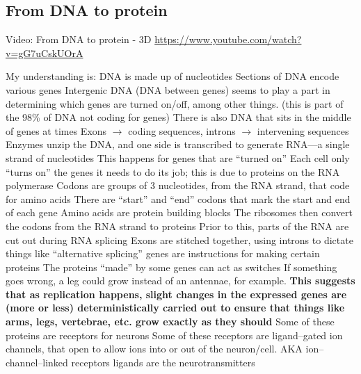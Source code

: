 \documentclass[11pt, a4paper, oneside]{article}   	%
\begin{document}
\subsection{From DNA to protein}

Video: From DNA to protein - 3D
\url{https://www.youtube.com/watch?v=gG7uCskUOrA}

\begin{outline}
  \nopoint My understanding is:
  \point DNA is made up of nucleotides
  \point Sections of DNA encode various genes
    \subpoint Intergenic DNA (DNA between genes) seems to play a part in determining which genes are turned on/off, among other things. (this is part of the 98\% of DNA not coding for genes)
        \subsubpoint There is also DNA that sits in the middle of genes at times
            \supersubpoint Exons $\rightarrow$ coding sequences, introns $\rightarrow$ intervening sequences
  \point Enzymes unzip the DNA, and one side is transcribed to generate RNA---a single strand of nucleotides
    \subpoint This happens for genes that are ``turned on'' 
    \subpoint Each cell only ``turns on'' the genes it needs to do its job; this is due to proteins on the RNA polymerase
  \point Codons are groups of 3 nucleotides, from the RNA strand, that code for amino acids
    \subpoint There are ``start'' and ``end'' codons that mark the start and end of each gene
  \point Amino acids are protein building blocks
  \point The ribosomes then convert the codons from the RNA strand to proteins
    \subpoint Prior to this, parts of the RNA are cut out during RNA splicing
        \subsubpoint Exons are stitched together, using introns to dictate things like ``alternative splicing''
    \subpoint genes are instructions for making certain proteins
  \point The proteins ``made'' by some genes can act as switches
    \subpoint If something goes wrong, a leg could grow instead of an antennae, for example.
        \subsubpoint \textbf{This suggests that as replication happens, slight changes in the expressed genes are (more or less) deterministically carried out to ensure that things like arms, legs, vertebrae, etc. grow exactly as they should}
  \point Some of these proteins are receptors for neurons 
    \subpoint Some of these receptors are ligand--gated ion channels, that open to allow ions into or out of the neuron/cell.
        \subsubpoint AKA ion--channel--linked receptors
        \subsubpoint ligands are the neurotransmitters
    

  
\end{outline}
\end{document}
